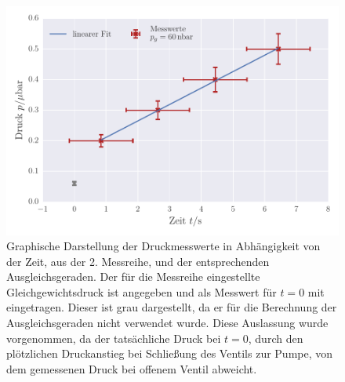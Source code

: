 \begin{figure}[!h]
 \centering
 \includegraphics[scale=0.65]{../Grafiken/Leckrate_Turbo_1.pdf}	
 \caption{Graphische Darstellung der Druckmesswerte in Abhängigkeit von der Zeit, aus der 2. Messreihe, und der
 	entsprechenden Ausgleichsgeraden. Der für die Messreihe eingestellte Gleichgewichtsdruck ist angegeben und als Messwert für $t=0$ mit eingetragen. Dieser ist grau dargestellt, da er für die 
 	Berechnung der Ausgleichsgeraden nicht verwendet wurde. Diese Auslassung wurde vorgenommen, da
 	der tatsächliche Druck bei $t=0$, durch den plötzlichen Druckanstieg bei Schließung des Ventils zur Pumpe, von dem
 	gemessenen Druck bei offenem Ventil abweicht.
 \label{fig:leckrate_turbo_1}}
 \end{figure} 